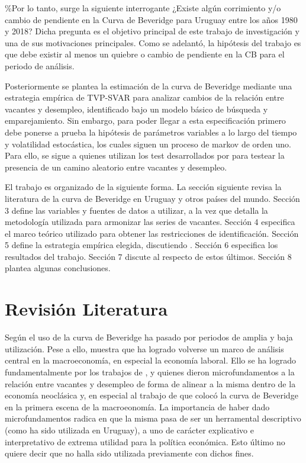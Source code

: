 \documentclass[msc,oneside,a4paper]{udelar} %
\begin{document}
  \%Por lo tanto, surge la siguiente interrogante ¿Existe algún corrimiento y/o cambio de pendiente en la Curva de Beveridge para Uruguay entre los años 1980 y 2018? Dicha pregunta es el objetivo principal de este trabajo de investigación y una de sus motivaciones principales. Como se adelantó, la hipótesis del trabajo es que debe existir al menos un quiebre o cambio de pendiente en la CB para el periodo de análisis.
  
  Posteriormente se plantea la estimación de la curva de Beveridge mediante una estrategia empírica de TVP-SVAR para analizar cambios de la relación entre vacantes y desempleo, identificado bajo un modelo básico de búsqueda y emparejamiento. Sin embargo, para poder llegar a esta especificación primero debe ponerse a prueba la hipótesis de parámetros variables a lo largo del tiempo y volatilidad estocástica, los cuales siguen un proceso de markov de orden uno. Para ello, se sigue a \cite{Benati2013} quienes utilizan los test desarrollados por \cite{Stock1996, Stock1998} para testear la presencia de un camino aleatorio entre vacantes y desempleo.
  
  El trabajo es organizado de la siguiente forma. La sección siguiente revisa la literatura de la curva de Beveridge en Uruguay y otros países del mundo. Sección 3 define las variables y fuentes de datos a utilizar, a la vez que detalla la metodología utilizada para armonizar las series de vacantes. Sección 4 especifica el marco teórico utilizado para obtener las restricciones de identificación. Sección 5 define la estrategia empírica elegida, discutiendo . Sección 6 especifica los resultados del trabajo. Sección 7 discute al respecto de estos últimos. Sección 8 plantea algunas conclusiones.
  
  \hypertarget{fundamentos}{%
  \chapter{Revisión Literatura}\label{fundamentos}}
  
  Según \cite{Rodenburg2007} el uso de la curva de Beveridge ha pasado por periodos de amplia y baja utilización. Pese a ello, \cite{Elsby2015} muestra que ha logrado volverse un marco de análisis central en la macroeconomía, en especial la economía laboral. Ello se ha logrado fundamentalmente por los trabajos de \cite{Pissarides1985}, \cite{Mortensen1994} y \cite{Diamond1982} quienes dieron microfundamentos a la relación entre vacantes y desempleo de forma de alinear a la misma dentro de la economía neoclásica y, en especial al trabajo de \cite{Blanchard1989} que colocó la curva de Beveridge en la primera escena de la macroeonomía. La importancia de haber dado microfundamentos radica en que la misma pasa de ser un herramental descriptivo (como ha sido utilizada en Uruguay), a uno de carácter explicativo e interpretativo de extrema utilidad para la política económica. Esto último no quiere decir que no halla sido utilizada previamente con dichos fines.
  
\end{document}
